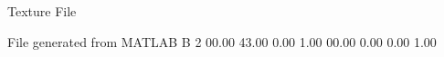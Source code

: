Texture File

File generated from MATLAB
B 2
   00.00   43.00   0.00   1.00
   00.00   0.00   0.00   1.00